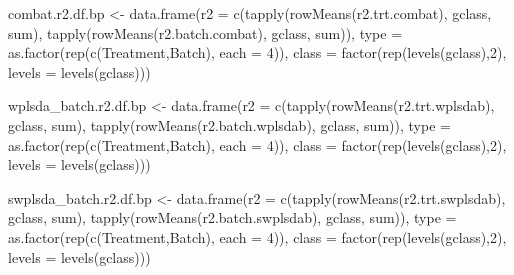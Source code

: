 \documentclass[
]{book}
\newenvironment{Shaded}{\begin{snugshade}}{\end{snugshade}}
\newcommand{\AttributeTok}[1]{\textcolor[rgb]{0.77,0.63,0.00}{#1}}
\newcommand{\DecValTok}[1]{\textcolor[rgb]{0.00,0.00,0.81}{#1}}
\newcommand{\FunctionTok}[1]{\textcolor[rgb]{0.00,0.00,0.00}{#1}}
\newcommand{\NormalTok}[1]{#1}
\newcommand{\OtherTok}[1]{\textcolor[rgb]{0.56,0.35,0.01}{#1}}
\newcommand{\StringTok}[1]{\textcolor[rgb]{0.31,0.60,0.02}{#1}}
\begin{document}
\begin{Shaded}
\begin{Highlighting}[]
\NormalTok{combat.r2.df.bp }\OtherTok{\textless{}{-}} 
  \FunctionTok{data.frame}\NormalTok{(}\AttributeTok{r2 =} \FunctionTok{c}\NormalTok{(}\FunctionTok{tapply}\NormalTok{(}\FunctionTok{rowMeans}\NormalTok{(r2.trt.combat), gclass, sum), }
                    \FunctionTok{tapply}\NormalTok{(}\FunctionTok{rowMeans}\NormalTok{(r2.batch.combat), gclass, sum)), }
             \AttributeTok{type =} \FunctionTok{as.factor}\NormalTok{(}\FunctionTok{rep}\NormalTok{(}\FunctionTok{c}\NormalTok{(}\StringTok{\textquotesingle{}Treatment\textquotesingle{}}\NormalTok{,}\StringTok{\textquotesingle{}Batch\textquotesingle{}}\NormalTok{), }\AttributeTok{each =} \DecValTok{4}\NormalTok{)),}
             \AttributeTok{class =} \FunctionTok{factor}\NormalTok{(}\FunctionTok{rep}\NormalTok{(}\FunctionTok{levels}\NormalTok{(gclass),}\DecValTok{2}\NormalTok{), }\AttributeTok{levels =} \FunctionTok{levels}\NormalTok{(gclass)))}

\NormalTok{wplsda\_batch.r2.df.bp }\OtherTok{\textless{}{-}} 
  \FunctionTok{data.frame}\NormalTok{(}\AttributeTok{r2 =} \FunctionTok{c}\NormalTok{(}\FunctionTok{tapply}\NormalTok{(}\FunctionTok{rowMeans}\NormalTok{(r2.trt.wplsdab), gclass, sum), }
                    \FunctionTok{tapply}\NormalTok{(}\FunctionTok{rowMeans}\NormalTok{(r2.batch.wplsdab), gclass, sum)), }
             \AttributeTok{type =} \FunctionTok{as.factor}\NormalTok{(}\FunctionTok{rep}\NormalTok{(}\FunctionTok{c}\NormalTok{(}\StringTok{\textquotesingle{}Treatment\textquotesingle{}}\NormalTok{,}\StringTok{\textquotesingle{}Batch\textquotesingle{}}\NormalTok{), }\AttributeTok{each =} \DecValTok{4}\NormalTok{)),}
             \AttributeTok{class =} \FunctionTok{factor}\NormalTok{(}\FunctionTok{rep}\NormalTok{(}\FunctionTok{levels}\NormalTok{(gclass),}\DecValTok{2}\NormalTok{), }\AttributeTok{levels =} \FunctionTok{levels}\NormalTok{(gclass)))}

\NormalTok{swplsda\_batch.r2.df.bp }\OtherTok{\textless{}{-}} 
  \FunctionTok{data.frame}\NormalTok{(}\AttributeTok{r2 =} \FunctionTok{c}\NormalTok{(}\FunctionTok{tapply}\NormalTok{(}\FunctionTok{rowMeans}\NormalTok{(r2.trt.swplsdab), gclass, sum), }
                    \FunctionTok{tapply}\NormalTok{(}\FunctionTok{rowMeans}\NormalTok{(r2.batch.swplsdab), gclass, sum)), }
             \AttributeTok{type =} \FunctionTok{as.factor}\NormalTok{(}\FunctionTok{rep}\NormalTok{(}\FunctionTok{c}\NormalTok{(}\StringTok{\textquotesingle{}Treatment\textquotesingle{}}\NormalTok{,}\StringTok{\textquotesingle{}Batch\textquotesingle{}}\NormalTok{), }\AttributeTok{each =} \DecValTok{4}\NormalTok{)),}
             \AttributeTok{class =} \FunctionTok{factor}\NormalTok{(}\FunctionTok{rep}\NormalTok{(}\FunctionTok{levels}\NormalTok{(gclass),}\DecValTok{2}\NormalTok{), }\AttributeTok{levels =} \FunctionTok{levels}\NormalTok{(gclass)))}



\end{Highlighting}
\end{Shaded}
\end{document}

